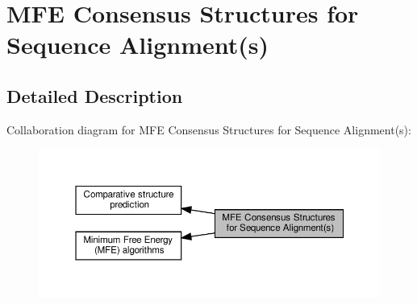 \hypertarget{group__consensus__mfe__fold}{}\section{M\+FE Consensus Structures for Sequence Alignment(s)}
\label{group__consensus__mfe__fold}


\subsection{Detailed Description}
Collaboration diagram for M\+FE Consensus Structures for Sequence Alignment(s)\+:
\nopagebreak
\begin{figure}[H]
\begin{center}
\leavevmode
\includegraphics[width=350pt]{group__consensus__mfe__fold}
\end{center}
\end{figure}

